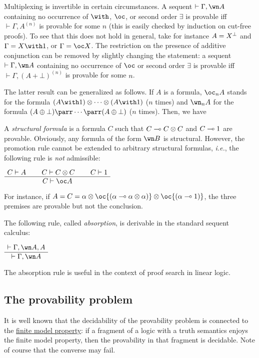 Multiplexing is invertible in certain circumstances. A sequent
\(\vdash\Gamma,\wn A\) containing no occurrence of \(\with\), \(\oc\),
or second order \(\exists\) is provable iff \(\vdash\Gamma,A^{(n)}\) is
provable for some \(n\) (this is easily checked by induction on cut-free
proofs). To see that this does not hold in general, take for instance
\(A=X^\bot\) and \(\Gamma=X\with\one\), or \(\Gamma=\oc X\). The
restriction on the presence of additive conjunction can be removed by
slightly changing the statement: a sequent \(\vdash\Gamma,\wn A\)
containing no occurrence of \(\oc\) or second order \(\exists\) is
provable iff \(\vdash\Gamma,(A\plus\bot)^{(n)}\) is provable for some
\(n\).

The latter result can be generalized as follows. If \(A\) is a formula,
\(\oc_nA\) stands for the formula
\((A\with\one)\tens\cdots\tens(A\with\one)\) (\(n\) times) and
\(\wn_nA\) for the formula \((A\plus\bot)\parr\cdots\parr(A\plus\bot)\)
(\(n\) times). Then, we have

A \emph{structural formula} is a formula \(C\) such that
\(C\multimap C\otimes C\) and \(C\multimap1\) are provable. Obviously, any
formula of the form \(\wn B\) is structural. However, the promotion rule
cannot be extended to arbitrary structural formulas, \emph{i.e.}, the
following rule is \emph{not} admissible:

\(\AxRule{C\vdash A}
\AxRule{C\vdash C\tens C}
\AxRule{C\vdash\one}
\TriRule{C\vdash\oc A}
\DisplayProof\)

For instance, if
\(A=C=\alpha\tens\oc{(\alpha\limp\alpha\tens\alpha)}\tens\oc{(\alpha\limp\one)}\),
the three premises are provable but not the conclusion.

The following rule, called \emph{absorption}, is derivable in the
standard sequent calculus:

\(\AxRule{\vdash\Gamma,\wn A,A}
\UnaRule{\vdash\Gamma,\wn A}
\DisplayProof\)

The absorption rule is useful in the context of proof search in linear
logic.

\subsection{The provability problem}\label{the-provability-problem}

It is well known that the decidability of the provability problem is
connected to the \href{Phase_semantics}{finite model property}: if a
fragment of a logic with a truth semantics enjoys the finite model
property, then the provability in that fragment is decidable. Note of
course that the converse may fail.

